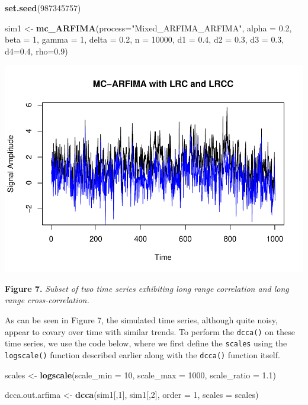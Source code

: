 \documentclass[
  man]{apa6}
\newenvironment{Shaded}{\begin{snugshade}}{\end{snugshade}}
\newcommand{\AttributeTok}[1]{\textcolor[rgb]{0.13,0.29,0.53}{#1}}
\newcommand{\DecValTok}[1]{\textcolor[rgb]{0.00,0.00,0.81}{#1}}
\newcommand{\FloatTok}[1]{\textcolor[rgb]{0.00,0.00,0.81}{#1}}
\newcommand{\FunctionTok}[1]{\textcolor[rgb]{0.13,0.29,0.53}{\textbf{#1}}}
\newcommand{\NormalTok}[1]{#1}
\newcommand{\OtherTok}[1]{\textcolor[rgb]{0.56,0.35,0.01}{#1}}
\newcommand{\StringTok}[1]{\textcolor[rgb]{0.31,0.60,0.02}{#1}}
\begin{document}
\begin{Shaded}
\begin{Highlighting}[]
\FunctionTok{set.seed}\NormalTok{(}\DecValTok{987345757}\NormalTok{)}

\NormalTok{sim1 }\OtherTok{\textless{}{-}} \FunctionTok{mc\_ARFIMA}\NormalTok{(}\AttributeTok{process=}\StringTok{"Mixed\_ARFIMA\_ARFIMA"}\NormalTok{, }\AttributeTok{alpha =} \FloatTok{0.2}\NormalTok{, }
\AttributeTok{beta =} \DecValTok{1}\NormalTok{, }\AttributeTok{gamma =} \DecValTok{1}\NormalTok{, }\AttributeTok{delta =} \FloatTok{0.2}\NormalTok{, }\AttributeTok{n =} \DecValTok{10000}\NormalTok{, }\AttributeTok{d1 =} \FloatTok{0.4}\NormalTok{, }\AttributeTok{d2 =} \FloatTok{0.3}\NormalTok{, }
\AttributeTok{d3 =} \FloatTok{0.3}\NormalTok{, }\AttributeTok{d4=}\FloatTok{0.4}\NormalTok{, }\AttributeTok{rho=}\FloatTok{0.9}\NormalTok{)}
\end{Highlighting}
\end{Shaded}

\includegraphics{fractal_regression_paper_brm_files/figure-latex/unnamed-chunk-15-1.pdf}

\textbf{Figure 7.} \emph{Subset of two time series exhibiting long range
correlation and long range cross-correlation.}

As can be seen in Figure 7, the simulated time series, although quite
noisy, appear to covary over time with similar trends. To perform the
\texttt{dcca()} on these time series, we use the code below, where we first
define the \texttt{scales} using the \texttt{logscale()} function described earlier
along with the \texttt{dcca()} function itself.

\begin{Shaded}
\begin{Highlighting}[]
\NormalTok{scales }\OtherTok{\textless{}{-}} \FunctionTok{logscale}\NormalTok{(}\AttributeTok{scale\_min =} \DecValTok{10}\NormalTok{, }\AttributeTok{scale\_max =} \DecValTok{1000}\NormalTok{, }\AttributeTok{scale\_ratio =} \FloatTok{1.1}\NormalTok{)}

\NormalTok{dcca.out.arfima }\OtherTok{\textless{}{-}} \FunctionTok{dcca}\NormalTok{(sim1[,}\DecValTok{1}\NormalTok{], sim1[,}\DecValTok{2}\NormalTok{], }\AttributeTok{order =} \DecValTok{1}\NormalTok{, }\AttributeTok{scales =}\NormalTok{ scales)}
\end{Highlighting}
\end{Shaded}
\end{document}
